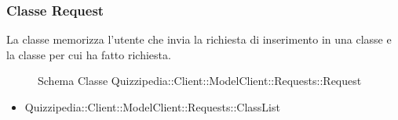\subsubsection{Classe Request}
La classe memorizza l'utente che invia la richiesta di inserimento in una classe e la classe per cui ha fatto richiesta.
\begin{figure}[H]
\centering
\noindent{}
\caption{Schema Classe Quizzipedia::Client::ModelClient::Requests::Request}
\end{figure}
\begin{itemize}
\item Quizzipedia::Client::ModelClient::Requests::ClassList
\end{itemize}
